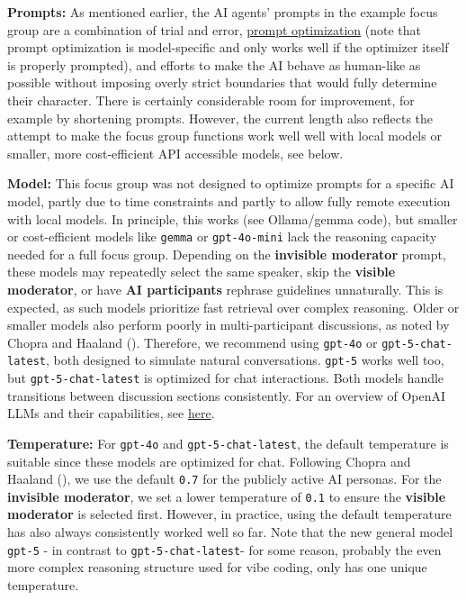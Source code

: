 \documentclass[
  letterpaper,
  DIV=11,
  numbers=noendperiod]{scrartcl}
\begin{document}
\textbf{Prompts:} As mentioned earlier, the AI agents' prompts in the
example focus group are a combination of trial and error,
\href{https://platform.openai.com/chat/edit?models=gpt-5&optimize=true}{prompt
optimization} (note that prompt optimization is model-specific and only
works well if the optimizer itself is properly prompted), and efforts to
make the AI behave as human-like as possible without imposing overly
strict boundaries that would fully determine their character. There is
certainly considerable room for improvement, for example by shortening
prompts. However, the current length also reflects the attempt to make
the focus group functions work well well with local models or smaller,
more cost-efficient API accessible models, see below.

\textbf{Model:} This focus group was not designed to optimize prompts
for a specific AI model, partly due to time constraints and partly to
allow fully remote execution with local models. In principle, this works
(see Ollama/gemma code), but smaller or cost-efficient models like
\texttt{gemma} or \texttt{gpt-4o-mini} lack the reasoning capacity
needed for a full focus group. Depending on the \textbf{invisible
moderator} prompt, these models may repeatedly select the same speaker,
skip the \textbf{visible moderator}, or have \textbf{AI participants}
rephrase guidelines unnaturally. This is expected, as such models
prioritize fast retrieval over complex reasoning. Older or smaller
models also perform poorly in multi-participant discussions, as noted by
Chopra and Haaland ().
Therefore, we recommend using \texttt{gpt-4o} or
\texttt{gpt-5-chat-latest}, both designed to simulate natural
conversations. \texttt{gpt-5} works well too, but
\texttt{gpt-5-chat-latest} is optimized for chat interactions. Both
models handle transitions between discussion sections consistently. For
an overview of OpenAI LLMs and their capabilities, see
\href{https://platform.openai.com/docs/models}{here}.

\textbf{Temperature:} For \texttt{gpt-4o} and
\texttt{gpt-5-chat-latest}, the default temperature is suitable since
these models are optimized for chat. Following Chopra and Haaland
(), we use the default
\texttt{0.7} for the publicly active AI personas. For the
\textbf{invisible moderator}, we set a lower temperature of \texttt{0.1}
to ensure the \textbf{visible moderator} is selected first. However, in
practice, using the default temperature has also always consistently
worked well so far. Note that the new general model \texttt{gpt-5} - in
contrast to \texttt{gpt-5-chat-latest}- for some reason, probably the
even more complex reasoning structure used for vibe coding, only has one
unique temperature.
\end{document}
